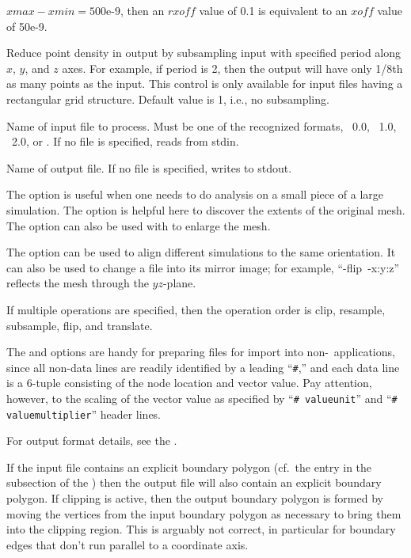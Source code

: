 \begin{description}
  $\mathit{xmax} - \mathit{xmin} = \mbox{500e-9}$, then an
  $\mathit{rxoff}$ value of 0.1 is equivalent
  to an $\mathit{xoff}$ value of 50e-9.
\item[\optkey{-subsample period}]
  Reduce point density in output by subsampling input with specified
  period along $x$, $y$, and $z$ axes.  For example, if period is 2,
  then the output will have only 1/8th as many points as the input.
  This control is only available for input files having a rectangular
  grid structure.  Default value is 1, i.e., no subsampling.
\item[\optkey{infile}]
  Name of input file to process.  Must be one of the recognized
  formats, \OVF\ 0.0, \OVF\ 1.0, \OVF\ 2.0, or \VIO.  If no file is
  specified, reads from stdin.
\item[\optkey{outfile}]
  Name of output file.  If no file is specified, writes to stdout.
\end{description}

The  option is useful when one needs to do analysis on a
small piece of a large simulation.  The  option is helpful
here to discover the extents of the original mesh.  The 
option can also be used with  to enlarge the mesh.

The  option can be used to align different simulations
to the same orientation.  It can also be used to change a file into its
mirror image; for example, ``-flip~-x:y:z'' reflects the mesh through
the $yz$-plane.

If multiple operations are specified, then the operation order is
clip, resample, subsample, flip, and translate.

The  and  options are handy for
preparing files for import into non-\OOMMF\ applications, since all
non-data lines are readily identified by a leading ``\verb+#+,'' and
each data line is a 6-tuple consisting of the node location and vector
value.  Pay attention, however, to the scaling of the vector value as
specified by ``\verb+# valueunit+'' and ``\verb+# valuemultiplier+''
header lines.

For output format details, see the .


If the input file contains an explicit boundary polygon (cf.\ the
 entry in the  subsection of the {}) then the
output file will also contain an explicit boundary polygon.  If clipping
is active, then the output boundary polygon is formed by moving the
vertices from the input boundary polygon as necessary to bring them into
the clipping region.  This is arguably not correct, in particular for
boundary edges that don't run parallel to a coordinate axis.


